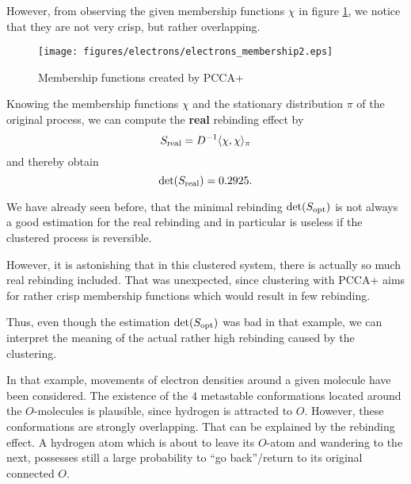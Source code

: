 However, from observing the given membership functions $\chi$ in figure \ref{fig:electron_membership}, we notice that they are not very crisp, but rather overlapping. %
\begin{figure}[!ht]
	\centering
	\texttt{[image: figures/electrons/electrons\_membership2.eps]}
	\caption{Membership functions created by PCCA+}
	\label{fig:electron_membership}
\end{figure}

Knowing the membership functions $\chi$ and the stationary distribution $\pi$ of the original process, we can compute the \textbf{real} rebinding effect by
\begin{equation*}
S_{\mathrm{real}} = D^{-1} \langle \chi, \chi \rangle_\pi
\end{equation*}
and thereby obtain
\begin{equation*}
\det(S_{\mathrm{real}}) = 0.2925.
\end{equation*}

We have already seen before, that the minimal rebinding $\det(S_{\mathrm{opt}})$ is not always a good estimation for the real rebinding and in particular is useless if the clustered process is reversible. %

However, it is astonishing that in this clustered system, there is actually so much real rebinding included. That was unexpected, since clustering with PCCA+ aims for rather crisp membership functions which would result in few rebinding.

Thus, even though the estimation $\det(S_{\mathrm{opt}})$ was bad in that example, we can interpret the meaning of the actual rather high rebinding caused by the clustering.


In that example, movements of electron densities around a given molecule have been considered.
The existence of the $4$ metastable conformations located around the $O$-molecules is plausible, since hydrogen is attracted to $O$.
However, these conformations are strongly overlapping. That can be explained by the rebinding effect. A hydrogen atom which is about to leave its $O$-atom and wandering to the next, possesses still a large probability to ``go back''/return to its original connected $O$.

